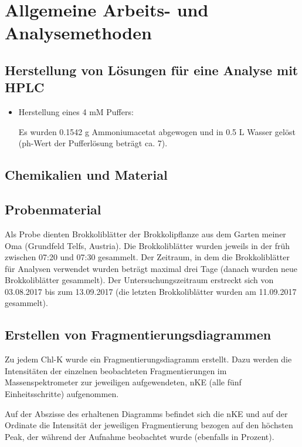 \chapter{Allgemeine Arbeits- und Analysemethoden}

\section{Herstellung von Lösungen für eine Analyse mit HPLC}

\begin{itemize}
\item Herstellung eines 4 mM  Puffers:

Es wurden 0.1542 g Ammoniumacetat abgewogen und in 0.5 L Wasser gelöst (ph-Wert der Pufferlösung beträgt ca. 7).

\end{itemize}

\section{Chemikalien und Material}

\section{Probenmaterial}

Als Probe dienten Brokkoliblätter der Brokkolipflanze aus dem Garten meiner Oma (Grundfeld Telfs, Austria). Die Brokkoliblätter wurden jeweils in der früh zwischen 07:20 und 07:30 gesammelt. Der Zeitraum, in dem die Brokkoliblätter für Analysen verwendet wurden beträgt maximal drei Tage (danach wurden neue Brokkoliblätter gesammelt). Der Untersuchungszeitraum erstreckt sich von 03.08.2017 bis zum 13.09.2017 (die letzten Brokkoliblätter wurden am 11.09.2017 gesammelt).\\

\section{Erstellen von Fragmentierungsdiagrammen} \label{sec:fragmentierungsdiagramme}

Zu jedem \gls{Chl-K} wurde ein Fragmentierungsdiagramm erstellt. Dazu werden die Intensitäten der einzelnen beobachteten Fragmentierungen im Massenspektrometer zur jeweiligen aufgewendeten, \gls{nKE} (alle fünf Einheitsschritte) aufgenommen. 

Auf der Abszisse des erhaltenen Diagramms befindet sich die \gls{nKE} und auf der Ordinate die Intensität der jeweiligen Fragmentierung bezogen auf den höchsten Peak, der während der Aufnahme beobachtet wurde (ebenfalls in Prozent). 

